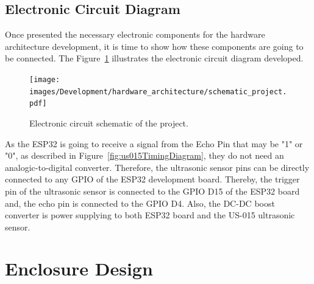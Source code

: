 \subsection{Electronic Circuit Diagram}

Once presented the necessary electronic components for the hardware architecture development, it is time to show how these components are going to be connected. The Figure~\ref{fig:schematic_projet} illustrates the electronic circuit diagram developed. 

\begin{figure}[h!]
    \centering
    \texttt{[image: images/Development/hardware\_architecture/schematic\_project.pdf]}
    \caption{Electronic circuit schematic of the project.}
    \label{fig:schematic_projet}
\end{figure}

As the ESP32 is going to receive a signal from the Echo Pin that may be "1" or "0", as described in Figure~\ref{fig:us015TimingDiagram}, they do not need an analogic-to-digital converter. Therefore, the ultrasonic sensor pins can be directly connected to any \gls{GPIO} of the ESP32 development board. Thereby, the trigger pin of the ultrasonic sensor is connected to the \gls{GPIO} D15 of the ESP32 board and, the echo pin is connected to the \gls{GPIO} D4. Also, the \gls{DC}-\gls{DC} boost converter is power supplying to both ESP32 board and the US-015 ultrasonic sensor.


\section{Enclosure Design}

